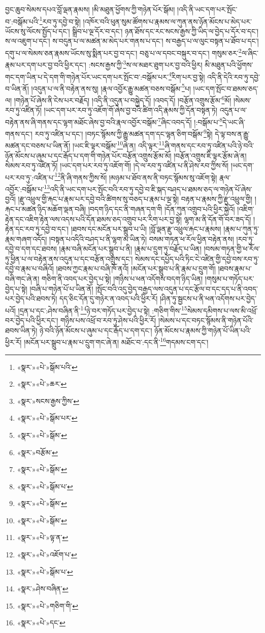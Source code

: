བྱང་ཆུབ་སེམས་དཔའ་བློ་ལྡན་རྣམས། །མི་མཐུན་ཕྱོགས་ཀྱི་གཉེན་པོར་སྒོམ། །འདི་ནི་ཡང་དག་པར་སྤོང་བ་:བསྒོམ་པའི་\footnote{«སྣར་»«པེ་»སྒོམ་པའི་}རབ་ཏུ་དབྱེ་བ་སྟེ། །འཁོར་བའི་ཕུན་སུམ་ཚོགས་པ་རྣམས་ལ་ཀུན་ནས་ཉོན་མོངས་པ་མེད་པར་ཡོངས་སུ་ལོངས་སྤྱོད་པ་དང་། སྒྲིབ་པ་ལྔ་དོར་བ་དང་། ཉན་ཐོས་དང་རང་སངས་རྒྱས་ཀྱི་ཡིད་ལ་བྱེད་པ་དོར་བ་དང་། ས་ལ་འཇུག་པ་དང་། ས་བདུན་པ་ལ་མཚན་མ་མེད་པར་གནས་པ་དང་། ས་བརྒྱད་པ་ལ་ལུང་བསྟན་པ་ཐོབ་པ་དང་། དགུ་པ་ལ་སེམས་ཅན་རྣམས་ཡོངས་སུ་སྨིན་པར་བྱ་བ་དང་། བཅུ་པ་ལ་དབང་བསྐུར་བ་དང་། གསུམ་ཅར་\footnote{«སྣར་»«པེ་»ཆར་}ལ་ཞིང་རྣམ་པར་དག་པར་བྱ་བའི་ཕྱིར་དང་། :སངས་རྒྱས་ཀྱི་\footnote{«སྣར་»སངས་རྒྱས་ཀྱིས་}ས་ལ་མཐར་ཐུག་པར་བྱ་བའི་ཕྱིར། མི་མཐུན་པའི་ཕྱོགས་གང་དག་ཡིན་པ་དེ་དག་གི་གཉེན་པོར་ཡང་དག་པར་སྤོང་བ་:བསྒོམ་པར་\footnote{«སྣར་»«པེ་»སྒོམ་པར་}རིག་པར་བྱ་སྟེ། འདི་ནི་དེའི་རབ་ཏུ་དབྱེ་བ་ཡིན་ནོ། །འདུན་པ་ལ་ནི་བརྟེན་ནས་སུ། །རྣལ་འབྱོར་རྒྱུ་མཚན་བཅས་བསྒོམ་\footnote{«སྣར་»«པེ་»སྒོམ་}པ། །ཡང་དག་སྤོང་བ་ཐམས་ཅད་ལ། །གཉེན་པོ་ཞེས་ནི་ངེས་པར་བརྗོད། །འདི་ནི་འདུན་པ་བསྐྱེད་དོ། །འབད་དོ། །བརྩོན་འགྲུས་རྩོམ་\footnote{«སྣར་»བརྩོམ་}མོ། །སེམས་རབ་ཏུ་འཛིན་ཏོ། །ཡང་དག་པར་རབ་ཏུ་འཇོག་གོ་ཞེས་བྱ་བའི་ཚིག་འདི་རྣམས་ཀྱི་དོན་བསྟན་ཏེ། འདུན་པ་ལ་བརྟེན་ནས་ཞི་གནས་དང་ལྷག་མཐོང་ཞེས་བྱ་བའི་རྣལ་འབྱོར་བསྒོམ་\footnote{«སྣར་»«པེ་»སྒོམ་}ཞིང་འབད་དོ། །:བསྒོམ་པ་\footnote{«སྣར་»«པེ་»སྒོམ་པ་}དེ་ཡང་ཞི་གནས་དང་། རབ་ཏུ་འཛིན་པ་དང་། །བཏང་སྙོམས་ཀྱི་རྒྱུ་མཚན་དག་དང་ལྷན་ཅིག་བསྒོམ་\footnote{«སྣར་»«པེ་»སྒོམ་}སྟེ། དེ་ལྟ་བས་ན་རྒྱུ་མཚན་དང་བཅས་པ་ཡིན་ནོ། །ཡང་ཇི་ལྟར་བསྒོམ་\footnote{«སྣར་»«པེ་»སྒོམ་}ཞེ་ན། འདི་ལྟར་\footnote{«སྣར་»«པེ་»ལྟ་ན་}ཞི་གནས་དང་རབ་ཏུ་འཛིན་པའི་ཉེ་བའི་ཉོན་མོངས་པ་ཞུམ་པ་དང་རྒོད་པ་དག་གི་གཉེན་པོར་བརྩོན་འགྲུས་རྩོམ་མོ། །བརྩོན་འགྲུས་ཇི་ལྟར་རྩོམ་ཞེ་ན། སེམས་རབ་ཏུ་འཛིན་ཏོ། །ཡང་དག་པར་རབ་ཏུ་འཇོག་གོ། །དེ་ལ་རབ་ཏུ་འཛིན་པ་ནི་ཤེས་རབ་ཀྱིས་སོ། །ཡང་དག་པར་རབ་ཏུ་:འཛིན་པ་\footnote{«སྣར་»«པེ་»འཇོག་པ་}ནི་ཞི་གནས་ཀྱིས་སོ། །མཉམ་པ་ཐོབ་ནས་ནི་བཏང་སྙོམས་སུ་འཇོག་སྟེ། རྣལ་འབྱོར་:བསྒོམ་པ་\footnote{«སྣར་»«པེ་»སྒོམ་པ་}འདི་ནི་ཡང་དག་པར་སྤོང་བའི་རབ་ཏུ་དབྱེ་བ་ཇི་སྐད་བཤད་པ་ཐམས་ཅད་ལ་གཉེན་པོ་ཞེས་བྱའོ། །རྫུ་འཕྲུལ་གྱི་རྐང་པ་རྣམ་པར་དབྱེ་བའི་ཚིགས་སུ་བཅད་པ་རྣམ་པ་ལྔ་སྟེ། བརྟན་པ་རྣམས་ཀྱི་རྫུ་འཕྲུལ་གྱི། །རྐང་པ་མཚན་ཉིད་མཆོག་ལྡན་བཞི། །བདག་ཉིད་དང་ནི་གཞན་དག་གི །དོན་ཀུན་འགྲུབ་པའི་ཕྱིར་སྐྱེའོ། །འཇིག་རྟེན་དང་འཇིག་རྟེན་ལས་འདས་པའི་དོན་ཐམས་ཅད་འགྲུབ་པར་རིག་པར་བྱ་སྟེ། ལྷག་མ་ནི་དོན་གོ་བར་ཟད་དོ། །རྟེན་དང་རབ་ཏུ་དབྱེ་བ་དང་། །ཐབས་དང་མངོན་པར་སྒྲུབ་པ་ཡི། །བློ་ལྡན་རྫུ་འཕྲུལ་རྐང་པ་རྣམས། །རྣམ་པ་ཀུན་ཏུ་རྣམ་གཞག་འདོད། །བསྟན་པའདིའི་བཤད་པ་ནི་ལྷག་མ་ཡིན་ཏེ། བསམ་གཏན་ཕ་རོལ་ཕྱིན་བརྟེན་ནས། །རབ་ཏུ་དབྱེ་བ་དག་དང་ཐབས། །རྣམ་བཞི་མངོན་པར་སྒྲུབ་པ་ནི། །རྣམ་པ་དྲུག་ཏུ་བརྗོད་པ་ཡིན། །བསམ་གཏན་གྱི་ཕ་རོལ་ཏུ་ཕྱིན་པ་ལ་བརྟེན་ནས་འདུན་པ་དང་བརྩོན་འགྲུས་དང་། སེམས་དང་དཔྱོད་པའི་ཏིང་ངེ་འཛིན་གྱི་དབྱེ་བས་རབ་ཏུ་དབྱེ་བ་རྣམ་པ་བཞིའོ། །ཐབས་ཀྱང་རྣམ་པ་བཞི་ཁོ་ནའོ། །མངོན་པར་སྒྲུབ་པ་ནི་རྣམ་པ་དྲུག་གོ། །ཐབས་རྣམ་པ་བཞི་གང་ཞེ་ན། གཅིག་ནི་འབད་པར་བྱེད་པ་སྟེ། །གཉིས་པ་ཕན་འདོགས་བདག་ཉིད་ཡིན། །གསུམ་པ་གཏོད་པར་བྱེད་པ་སྟེ། །བཞི་པ་གཉེན་པོ་པ་ཡིན་ནོ། །སྤོང་བའི་འདུ་བྱེད་བརྒྱད་ལས་འདུན་པ་དང་རྩོལ་བ་དང་དད་པ་ནི་འབད་པར་བྱེད་པའི་ཐབས་ཏེ། དད་ཅིང་དོན་དུ་གཉེར་ན་འབད་པའི་ཕྱིར་རོ། །ཤིན་ཏུ་སྦྱངས་པ་ནི་ཕན་འདོགས་པར་བྱེད་པའོ། །དྲན་པ་དང་:ཤེས་བཞིན་ནི་\footnote{«སྣར་»ཤེས་བཞིན་}ཉེ་བར་གཏོད་པར་བྱེད་པ་སྟེ། :གཅིག་གིས་\footnote{«སྣར་»«པེ་»གཅིག་གི་}སེམས་དམིགས་པ་ལས་མི་འཕྲོ་བར་བྱེད་པའི་ཕྱིར་དང་། གཉིས་པས་འཕྲོ་བ་རབ་ཏུ་ཤེས་པའི་ཕྱིར་རོ། །སེམས་པ་དང་བཏང་སྙོམས་ནི་གཉེན་པོའི་ཐབས་ཡིན་ཏེ། ཉེ་བའི་ཉོན་མོངས་པ་ཞུམ་པ་དང་རྒོད་པ་དག་དང་། ཉོན་མོངས་པ་རྣམས་ཀྱི་གཉེན་པོ་ཡིན་པའི་ཕྱིར་རོ། །མངོན་པར་སྒྲུབ་པ་རྣམ་པ་དྲུག་གང་ཞེ་ན། མཐོང་བ་:དང་ནི་\footnote{«སྣར་»«པེ་»དང་}གདམས་ངག་དང་། 